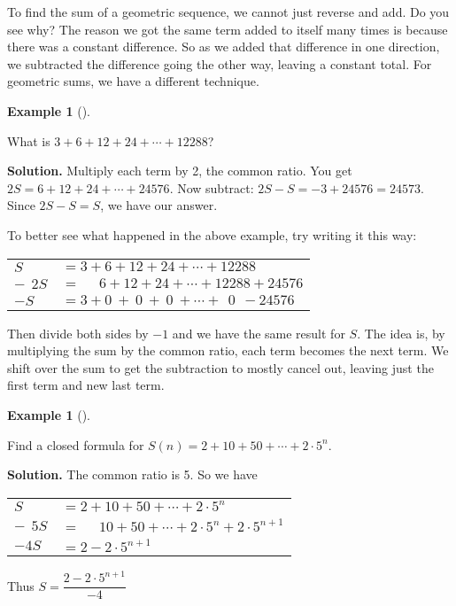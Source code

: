 \documentclass[10pt,]{book}
\theoremstyle{plain}
\theoremstyle{definition}
\newtheorem{example}[theorem]{Example}
\theoremstyle{definition}
\theoremstyle{definition}
\numberwithin{equation}{chapter}
\newcommand{\hrulethin}  {\noalign{\hrule height 0.04em}}
\begin{document}
        To find the sum of a geometric sequence, we cannot just reverse and add. Do you see why? The reason we got the same term added to itself many times is because there was a constant difference. So as we added that difference in one direction, we subtracted the difference going the other way, leaving a constant total. For geometric sums, we have a different technique.
\begin{example}[]\label{example-65}

            What is \(3 + 6 + 12 + 24 + \cdots + 12288\)?
\par\medskip\noindent%
\textbf{Solution.}\quad
            Multiply each term by 2, the common ratio. You get \(2S = 6 + 12 + 24 + \cdots + 24576\). Now subtract: \(2S - S = -3 + 24576 = 24573\). Since \(2S - S = S\), we have our answer.
\end{example}
\par

        To better see what happened in the above example, try writing it this way:
\leavevmode%
\begin{table}
\centering
\begin{tabular}{ll}
\(S\)&\(= 3 + 6 + 12 + 24 + \cdots + 12288\)\tabularnewline[0pt]
\(-~~2S\)&\(= ~~~~~~6 + 12 + 24 + \cdots + 12288 + 24576\)\tabularnewline\hrulethin
\(-S\)&\(= 3 + 0 ~+~ 0 ~+~ 0 ~ +  \cdots + ~~0 ~~ - 24576\)
\end{tabular}
\end{table}
\par

        Then divide both sides by \(-1\) and we have the same result for \(S\). The idea is, by multiplying the sum by the common ratio, each term becomes the next term. We shift over the sum to get the subtraction to mostly cancel out, leaving just the first term and new last term.
\begin{example}[]\label{example-66}

            Find a closed formula for \(S(n) = 2 + 10 + 50 + \cdots + 2\cdot 5^n\).
\par\medskip\noindent%
\textbf{Solution.}\quad
            The common ratio is 5. So we have
\leavevmode%
\begin{table}
\centering
\begin{tabular}{ll}
\(S\)&\(= 2 + 10 + 50 + \cdots + 2\cdot 5^n\)\tabularnewline[0pt]
\(-~~5S\)&\(= ~~~~~~10 + 50 + \cdots + 2\cdot 5^n + 2\cdot5^{n+1}\)\tabularnewline\hrulethin
\(-4S\)&\(= 2  - 2\cdot5^{n+1}\)
\end{tabular}
\end{table}
\par

            Thus \(S = \dfrac{2-2\cdot 5^{n+1}}{-4}\)
\end{example}
\par
\end{document}
